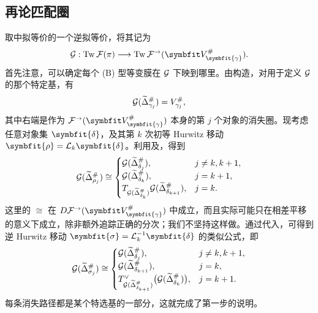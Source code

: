 \subsection{再论匹配圈}\label{sec:18k}
取中拟等价的一个逆拟等价，将其记为
\[
\G:\Tw\F(\pi)\longrightarrow\Tw\F^\to(\symbfit V_{\symbfit{\gamma}}^\#).
\]
首先注意，可以确定每个 (B) 型等变膜在 $\mathcal G$ 下映到哪里。由构造，对用于定义 $\mathcal G$ 的那个特定基，有
\[
\mathcal G(\widetilde\Delta_{\gamma_j}^\#)=V_{\gamma_j}^\#,
\]
其中右端是作为 $\F^\to(\symbfit V_{\symbfit{\gamma}}^\#)$ 本身的第 $j$ 个对象的消失圈。现考虑任意对象集 $\symbfit{\delta}$，及其第 $k$ 次初等 Hurwitz 移动 $\symbfit{\rho}=\mathcal L_k\symbfit{\delta}$。利用及，得到
\begin{equation}\label{eq:18.30}
\mathcal G(\widetilde\Delta_{\rho_j}^\#)\cong
\begin{cases}
\mathcal G(\widetilde\Delta_{\delta_j}^\#),&j\ne k,k+1,\\
\mathcal G(\widetilde\Delta_{\delta_k}^\#),&j=k+1,\\
T_{\mathcal G(\widetilde\Delta_{\delta_k}^\#)}\mathcal G(\widetilde\Delta_{\delta_{k+1}}^\#),&j=k.
\end{cases}
\end{equation}
这里的 $\cong$ 在 $D\F^\to(\symbfit V_{\symbfit{\gamma}}^\#)$ 中成立，而且实际可能只在相差平移的意义下成立，除非额外追踪正确的分次；我们不坚持这样做。通过代入，可得到逆 Hurwitz 移动 $\symbfit{\sigma}=\mathcal L_k^{-1}\symbfit{\delta}$ 的类似公式，即
\[
\mathcal G(\widetilde\Delta_{\sigma_j}^\#)\cong
\begin{cases}
\mathcal G(\widetilde\Delta_{\delta_j}^\#),&j\ne k,k+1,\\
\mathcal G(\widetilde\Delta_{\delta_{k+1}}^\#),&j=k,\\
T^\vee_{\mathcal G(\widetilde\Delta_{\delta_{k+1}}^\#)}\bigl(\mathcal G(\widetilde\Delta_{\delta_k}^\#)\bigr),&j=k+1.
\end{cases}
\]
每条消失路径都是某个特选基的一部分，这就完成了第一步的说明。

